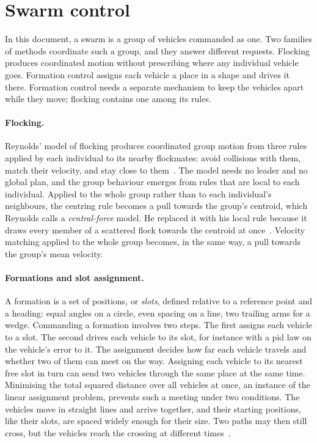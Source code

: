 \section{Swarm control}
\label{sec:bg-swarm}
In this document, a swarm is a group of vehicles commanded as one. Two families of methods
coordinate such a group, and they answer different requests. Flocking produces coordinated motion
without prescribing where any individual vehicle goes. Formation control assigns each vehicle a
place in a shape and drives it there. Formation control needs a separate mechanism to keep the
vehicles apart while they move; flocking contains one among its rules.

\paragraph{Flocking.} Reynolds' model of flocking produces coordinated group motion from three rules
applied by each individual to its nearby flockmates: avoid collisions with them, match their
velocity, and stay close to them~\cite{reynolds1987}. The model needs no leader and no global plan,
and the group behaviour emerges from rules that are local to each individual. Applied to the whole
group rather than to each individual's neighbours, the centring rule becomes a pull towards the
group's centroid, which Reynolds calls a \emph{central-force} model. He replaced it with his local
rule because it draws every member of a scattered flock towards the centroid at
once~\cite{reynolds1987}. Velocity matching applied to the whole group becomes, in the same way, a
pull towards the group's mean velocity.

\paragraph{Formations and slot assignment.} A formation is a set of positions, or \emph{slots},
defined relative to a reference point and a heading: equal angles on a circle, even spacing on a
line, two trailing arms for a wedge. Commanding a formation involves two steps. The first assigns
each vehicle to a slot. The second drives each vehicle to its slot, for instance with a \gls{pid}
law on the vehicle's error to it. The assignment decides how far each vehicle travels and whether
two of them can meet on the way. Assigning each vehicle to its nearest free slot in turn can send
two vehicles through the same place at the same time. Minimising the total squared distance over all
vehicles at once, an instance of the linear assignment problem, prevents such a meeting under two
conditions. The vehicles move in straight lines and arrive together, and their starting positions,
like their slots, are spaced widely enough for their size. Two paths may then still cross, but the
vehicles reach the crossing at different times~\cite{turpin2014}.

